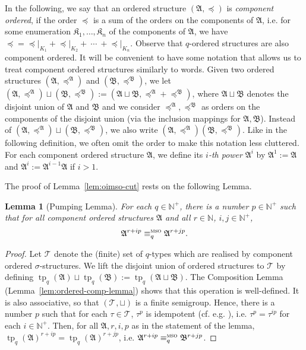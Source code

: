 \documentclass[11pt]{article}
\newtheorem{lemma}[theorem]{Lemma}
\newcommand{\logic}[1]{\textsc{#1}}
\newcommand{\MSO}{\logic{mso}}
\newcommand{\eleq}[1][]{\equiv_{#1}}
\newcommand{\msoeleq}[1][]{\eleq[#1]^{\MSO{}}}
\newcommand{\types}[1][\sigma,q,d]{\mathcal{T}_{#1}}
\newcommand{\rela}[2]{\ensuremath{{#1|}_{#2}}}
\newcommand{\relao}[2]{\rela{#1\!}{#2}}
\DeclareMathOperator{\tp}{tp}
\newcommand{\struct}[1]{\mathfrak{#1}}
\newcommand{\AS}{\struct{A}}
\newcommand{\BS}{\struct{B}}
\newcommand{\KS}{\struct{K}}
\newcommand{\N}{\mathbb{N}}
\newcommand{\Npos}{\mathbb{N}^{+}}
\newcommand{\disunion}{\sqcup}
\begin{document}
In the following, we say that an ordered structure $(\AS,\preceq)$ is
\emph{component ordered}, if the order $\preceq$ is a sum of the
orders on the components of $\AS$, i.e.  for some enumeration
$\KS_{1}, \ldots, \KS_{n}$ of the components of $\AS$, we have
$\preceq = \relao{\preceq}{K_{1}} + \relao{\preceq}{K_{2}} + \ \dotsb
\ + \relao{\preceq}{K_{n}}$.  Observe that $q$-ordered structures are
also component ordered.  It will be convenient to have some notation
that allows us to treat component ordered structures similarly to
words. Given two ordered structures $(\AS,\preceq^\AS)$ and
$(\BS,\preceq^\BS)$, we let $(\AS,\preceq^\AS) \disunion
(\BS,\preceq^\BS):=(\AS \disunion \BS, \preceq^\AS + \preceq^\BS)$,
where $\AS \disunion \BS$ denotes the disjoint union of $\AS$ and
$\BS$ and we consider $\preceq^\AS, \preceq^\BS$ as orders on the
components of the disjoint union (via the inclusion mappings for $\AS,
\BS$).  Instead of $(\AS,\preceq^\AS) \disunion (\BS,\preceq^\BS)$, we
also write $(\AS,\preceq^\AS)(\BS,\preceq^\BS)$.  Like in the
following definition, we often omit the order to make this notation
less cluttered. For each component ordered structure $\AS$, we define
its \emph{$i$-th power} $\AS^{i}$ by $\AS^{1}:=\AS$ and
$\AS^{i}:=\AS^{i-1}\AS$ if $i >1$.

The proof of Lemma~\ref{lem:oimso-cut} rests on the following Lemma.

\begin{lemma}[Pumping Lemma]
  \label{lem:pumping-lemma}
  For each $q\in \Npos$, there is a number $p\in \Npos$ such that for
  all component ordered structures $\AS$ and all $r\in \N$, $i,j\in \Npos$, 
  \[ \AS^{r+ip} \msoeleq[q] \AS^{r+jp}. \]
\end{lemma}
\begin{proof}
  Let $\types[]$ denote the (finite) set of $q$-types which are
  realised by component ordered $\sigma$-structures.  We lift the
  disjoint union of ordered structures to $\types[]$ by defining
  $\tp_q(\AS) \disunion \tp_q(\BS) := \tp_q(\AS \disunion \BS)$.  The
  Composition Lemma (Lemma~\ref{lem:ordered-comp-lemma}) shows that
  this operation is well-defined.  It is also associative, so that
  $(\types[],\disunion)$ is a finite semigroup.  Hence, there is a
  number $p$ such that for each $\tau\in \types[]$, $\tau^p$ is
  idempotent (cf. e.g. \cite{Howie1976}), i.e. $\tau^p = \tau^{ip}$
  for each $i\in \Npos$.  Then, for all $\AS, r,i,p$ as in the
  statement of the lemma, $\tp_q(\AS)^{r + ip} = \tp_q(\AS)^{r+jp}$,
  i.e.  $\AS^{r+ip} \msoeleq[q] \BS^{r+jp}$.
\end{proof}
\end{document}
